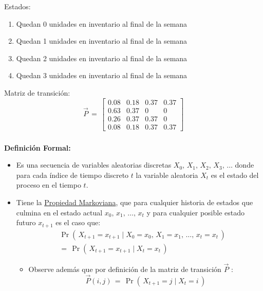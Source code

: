 \documentclass[ 10pt, xcolor = dvipsnames]{beamer}
\begin{document}
\begin{frame}[allowframebreaks]
Estados: 
\begin{enumerate}
\item Quedan 0 unidades en inventario al final de la semana
\item Quedan 1 unidades en inventario al final de la semana
\item Quedan 2 unidades en inventario al final de la semana
\item Quedan 3 unidades en inventario al final de la semana
\end{enumerate}

Matriz de transici\'on:
\[
\vec{P} \, = \, 
\left[
\begin{array}{cccc}
0.08 & 0.18 & 0.37 & 0.37 \\
0.63 & 0.37 & 0    & 0    \\
0.26 & 0.37 & 0.37 & 0    \\
0.08 & 0.18 & 0.37 & 0.37
\end{array}
\right]
\]

\framebreak

\end{frame}

\begin{frame}[allowframebreaks]
\frametitle{\insertsubsection}

\textbf{Definici\'on Formal:}
\begin{itemize}
\item Es una secuencia de variables aleatorias discretas $X_0, \, X_1, \, X_2, \, X_3, \, \dots$ \linebreak donde para cada \'indice de tiempo discreto $t$ la variable aleatoria $X_t$ \linebreak es el estado del proceso en el tiempo $t$. 
\item Tiene la \underline{Propiedad Markoviana}, \ie que para cualquier historia de estados que culmina en el estado actual $x_0, \, x_1, \, \dots, \, x_t$ y para cualquier posible \linebreak estado futuro $x_{t+1}$ es el caso que: 
\begin{align*}
& \Pr( \, X_{t+1} = x_{t+1} \mid 
X_{0} = x_{0}, \, X_{1} = x_{1}, \, \dots, \, x_{t} = x_{t} \, ) \\[1ex]
& = \, \Pr( \, X_{t+1} = x_{t+1} \mid X_{t} = x_{t} \, )
\end{align*}
\fullcut
\halfcut
\begin{itemize}
\item Observe adem\'as que por definici\'on de la matriz de transici\'on $\vec{P}$ : 
\[
\vec{P}(i,j) \, = \,
\Pr( \, X_{t+1} = j \mid X_{t} = i \, )
\]
\end{itemize}

\end{itemize}

\end{frame}
\end{document}
